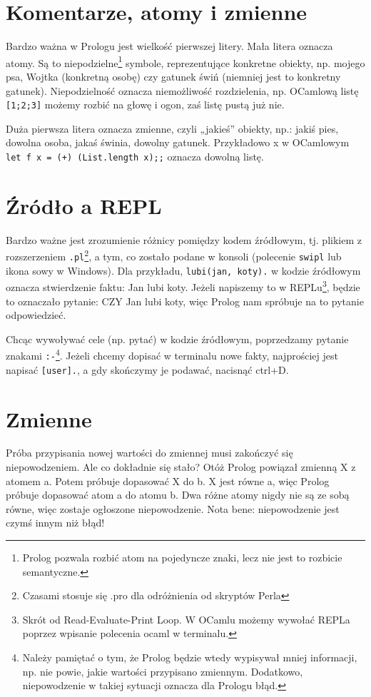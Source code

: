 \documentclass[12pt,a4paper]{article}
\begin{document}
\section{Komentarze, atomy i zmienne}
Bardzo ważna w Prologu jest wielkość pierwszej litery. Mała litera oznacza atomy. Są to niepodzielne\footnote{Prolog pozwala rozbić atom na pojedyncze znaki, lecz nie jest to rozbicie semantyczne.} symbole, reprezentujące konkretne obiekty, np. mojego psa, Wojtka (konkretną osobę) czy gatunek świń (niemniej jest to konkretny gatunek). Niepodzielność oznacza niemożliwość rozdzielenia, np. OCamlową listę \verb![1;2;3]! możemy rozbić na głowę i ogon, zaś listę pustą już nie.

Duża pierwsza litera oznacza zmienne, czyli „jakieś” obiekty, np.: jakiś pies, dowolna osoba, jakaś świnia, dowolny gatunek. Przykładowo x w OCamlowym \verb!let f x = (+) (List.length x);;! oznacza dowolną listę.

\section{Źródło a REPL}
Bardzo ważne jest zrozumienie różnicy pomiędzy kodem źródłowym, tj. plikiem z rozszerzeniem \verb+.pl+\footnote{Czasami stosuje się .pro dla odróżnienia od skryptów Perla}, a tym, co zostało podane w konsoli (polecenie \verb!swipl! lub ikona sowy w Windows). Dla przykładu, \verb!lubi(jan, koty).! w kodzie źródłowym oznacza stwierdzenie faktu: Jan lubi koty. Jeżeli napiszemy to w REPLu\footnote{Skrót od Read-Evaluate-Print Loop. W OCamlu możemy wywołać REPLa poprzez wpisanie polecenia ocaml w terminalu.}, będzie to oznaczało pytanie: CZY Jan lubi koty, więc Prolog nam spróbuje na to pytanie odpowiedzieć.

Chcąc wywoływać cele (np. pytać) w kodzie źródłowym, poprzedzamy pytanie znakami \verb+:-+\footnote{Należy pamiętać o tym, że Prolog będzie wtedy wypisywał mniej informacji, np. nie powie, jakie wartości przypisano zmiennym. Dodatkowo, niepowodzenie w takiej sytuacji oznacza dla Prologu błąd.}. Jeżeli chcemy dopisać w terminalu nowe fakty, najprościej jest napisać \verb+[user].+, a gdy skończymy je podawać, nacisnąć ctrl+D.

\section{Zmienne}
Próba przypisania nowej wartości do zmiennej musi zakończyć się niepowodzeniem. Ale co dokładnie się stało? Otóż Prolog powiązał zmienną X z atomem a. Potem próbuje dopasować X do b. X jest równe a, więc Prolog próbuje dopasować atom a do atomu b. Dwa różne atomy nigdy nie są ze sobą równe, więc zostaje ogłoszone niepowodzenie. Nota bene: niepowodzenie jest czymś innym niż błąd!
\end{document}

